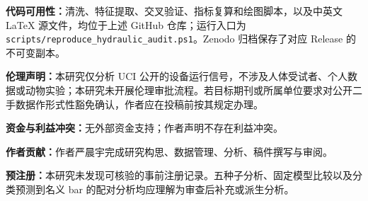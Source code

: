 \documentclass[UTF8,12pt,a4paper]{ctexart}
\begin{document}
\textbf{代码可用性：}清洗、特征提取、交叉验证、指标复算和绘图脚本，以及中英文 LaTeX 源文件，均位于上述 GitHub 仓库；运行入口为 \texttt{scripts/reproduce\_hydraulic\_audit.ps1}。Zenodo 归档保存了对应 Release 的不可变副本。

\textbf{伦理声明：}本研究仅分析 UCI 公开的设备运行信号，不涉及人体受试者、个人数据或动物实验；本研究未开展伦理审批流程。若目标期刊或所属单位要求对公开二手数据作形式性豁免确认，作者应在投稿前按其规定办理。

\textbf{资金与利益冲突：}无外部资金支持；作者声明不存在利益冲突。

\textbf{作者贡献：}作者严晨宇完成研究构思、数据管理、分析、稿件撰写与审阅。

\textbf{预注册：}本研究未发现可核验的事前注册记录。五种子分析、固定模型比较以及分类预测到名义 bar 的配对分析均应理解为审查后补充或派生分析。
\end{document}
